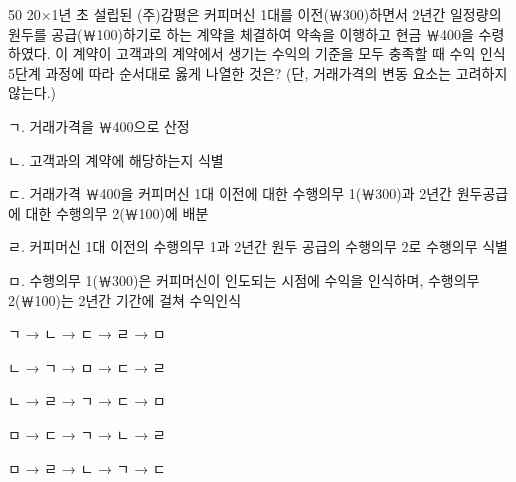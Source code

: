 \begin{question}{50}
20×1년 초 설립된 (주)감평은 커피머신 1대를 이전(￦300)하면서 2년간 일정량의 원두를 공급(￦100)하기로 하는 계약을 체결하여 약속을 이행하고 현금 ￦400을 수령하였다. 이 계약이 고객과의 계약에서 생기는 수익의 기준을 모두 충족할 때 수익 인식 5단계 과정에 따라 순서대로 옳게 나열한 것은? (단, 거래가격의 변동 요소는 고려하지 않는다.)
\begin{framedtext}
ㄱ. 거래가격을 ￦400으로 산정 \par
ㄴ. 고객과의 계약에 해당하는지 식별 \par
ㄷ. 거래가격 ￦400을 커피머신 1대 이전에 대한 수행의무 1(￦300)과 2년간 원두공급에 대한 수행의무 2(￦100)에 배분 \par
ㄹ. 커피머신 1대 이전의 수행의무 1과 2년간 원두 공급의 수행의무 2로 수행의무 식별 \par
ㅁ. 수행의무 1(￦300)은 커피머신이 인도되는 시점에 수익을 인식하며, 수행의무 2(￦100)는 2년간 기간에 걸쳐 수익인식
\end{framedtext}
\begin{choices}
  \item ㄱ → ㄴ → ㄷ → ㄹ → ㅁ
  \item ㄴ → ㄱ → ㅁ → ㄷ → ㄹ
  \item ㄴ → ㄹ → ㄱ → ㄷ → ㅁ
  \item ㅁ → ㄷ → ㄱ → ㄴ → ㄹ
  \item ㅁ → ㄹ → ㄴ → ㄱ → ㄷ
\end{choices}
\end{question}
